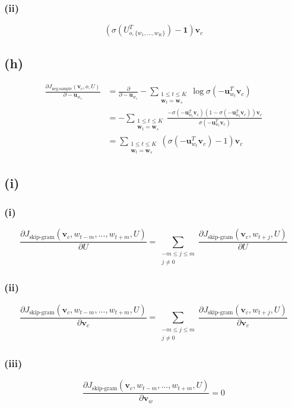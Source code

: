 \documentclass[12pt]{article}
\begin{document}
\subsubsection*{(ii)}
\begin{equation*}
    (\sigma(U_{o,\{w_1,...,w_K\}}^T) - \pmb{1}) \pmb{v}_c
\end{equation*}


\subsection*{(h)}
\begin{align*}
    \frac{\partial J_{\text{neg-sample}}(\pmb{v}_c, o, U)}{\partial -\pmb{u}_{w_s}} &= \frac{\partial}{\partial -\pmb{u}_{w_s}} - \sum_{\substack{1 \leq t \leq K \\ \pmb{w}_t = \pmb{w}_s}}{\log \sigma(-\pmb{u}_{w_t}^T \pmb{v}_c)}\\
    &= - \sum_{\substack{1 \leq t \leq K \\ \pmb{w}_t = \pmb{w}_s}}{\frac{-\sigma(-\pmb{u}_{w_t}^T \pmb{v}_c) (1 - \sigma(-\pmb{u}_{w_t}^T \pmb{v}_c)) \pmb{v}_c}{\sigma(-\pmb{u}_{w_t}^T \pmb{v}_c)}}\\
    &= \sum_{\substack{1 \leq t \leq K \\ \pmb{w}_t = \pmb{w}_s}}{(\sigma(-\pmb{u}_{w_t}^T \pmb{v}_c) - 1) \pmb{v}_c}
\end{align*}


\subsection*{(i)}

\subsubsection*{(i)}
\begin{equation*}
    \frac{\partial J_{\text{skip-gram}}(\pmb{v}_c, w_{t-m},..., w_{t+m}, U)}{\partial U} = \sum_{\substack{-m \leq j \leq m \\ j \neq 0}}{\frac{\partial J_{\text{skip-gram}}(\pmb{v}_c, w_{t+j}, U)}{\partial U}}
\end{equation*}

\subsubsection*{(ii)}
\begin{equation*}
    \frac{\partial J_{\text{skip-gram}}(\pmb{v}_c, w_{t-m},..., w_{t+m}, U)}{\partial \pmb{v}_c} = \sum_{\substack{-m \leq j \leq m \\ j \neq 0}}{\frac{\partial J_{\text{skip-gram}}(\pmb{v}_c, w_{t+j}, U)}{\partial \pmb{v}_c}}
\end{equation*}

\subsubsection*{(iii)}
\begin{equation*}
    \frac{\partial J_{\text{skip-gram}}(\pmb{v}_c, w_{t-m},..., w_{t+m}, U)}{\partial \pmb{v}_w} = 0
\end{equation*}
\end{document}
